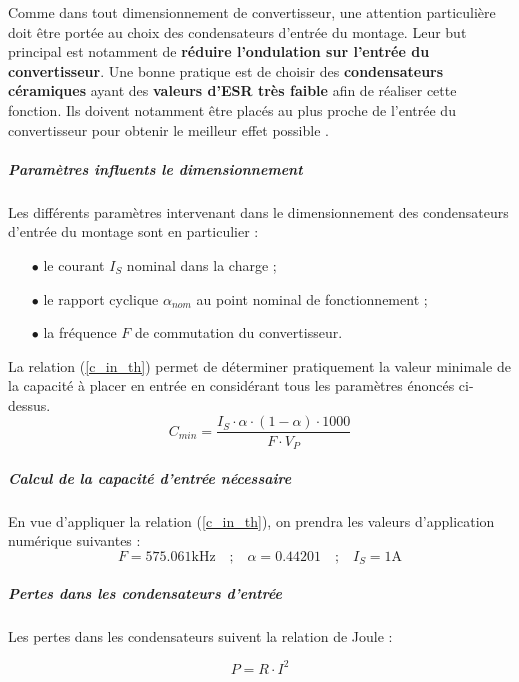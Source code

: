 \documentclass[a4paper,12pt]{book}
\begin{document}
					Comme dans tout dimensionnement de convertisseur, une attention particulière doit être portée au choix des condensateurs d'entrée du montage. Leur but principal est notamment de \textbf{réduire l'ondulation sur l'entrée du convertisseur}. Une bonne pratique est de choisir des \textbf{condensateurs céramiques} ayant des \textbf{valeurs d'ESR très faible} afin de réaliser cette fonction. Ils doivent notamment être placés au plus proche de l'entrée du convertisseur pour obtenir le meilleur effet possible \cite{A055}.
								
						\subparagraph{Paramètres influents le dimensionnement}
						Les différents paramètres intervenant dans le dimensionnement des condensateurs d'entrée du montage sont en particulier :
						
						\begin{itemize}
							\item[$\bullet$] le courant $I_{S}$ nominal dans la charge ;
							\item[$\bullet$] le rapport cyclique  $\alpha_{nom}$ au point nominal de fonctionnement ;
							\item[$\bullet$] la fréquence $F$ de commutation du convertisseur.	
						\end{itemize}
						
						La relation (\ref{c_in_th}) permet de déterminer pratiquement la valeur minimale de la capacité à placer en entrée en considérant tous les paramètres énoncés ci-dessus.
						\begin{equation}
							C_{min} = \frac{I_S\cdot\alpha\cdot(1-\alpha)\cdot 1000}{F\cdot V_P}
							\label{c_in_th}
						\end{equation}
						
						\subparagraph{Calcul de la capacité d'entrée nécessaire}
						
						En vue d'appliquer la relation (\ref{c_in_th}), on prendra les valeurs d'application numérique suivantes :		
						\begin{equation}
							F = 575.061\text{kHz} 
							\quad\text{;}\quad
							\alpha = 0.44201
							\quad\text{;}\quad
							I_S = 1\text{A}
						\end{equation}
						
						\subparagraph{Pertes dans les condensateurs d'entrée}
						
						Les pertes dans les condensateurs suivent la relation de Joule :
						
						\begin{equation}
							P = R \cdot I^2
						\end{equation}
						
\end{document}

